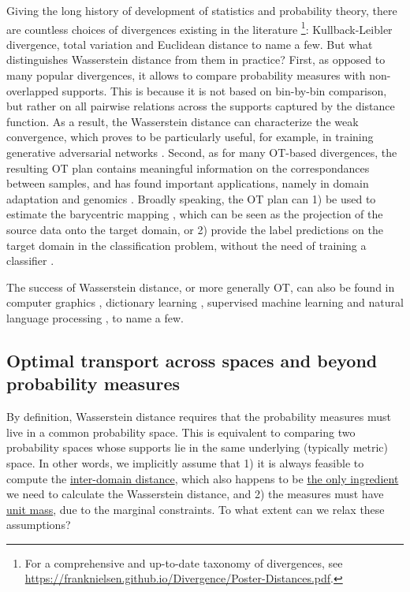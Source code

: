 Giving the long history of development of statistics and probability theory,
there are countless choices of divergences existing in the literature
\footnote{For a comprehensive and up-to-date taxonomy of divergences, see
\url{https://franknielsen.github.io/Divergence/Poster-Distances.pdf}.}:
Kullback-Leibler divergence, total variation and Euclidean distance to name a few.
But what distinguishes Wasserstein distance from them in practice?
First, as opposed to many popular divergences, it allows to compare probability measures with
non-overlapped supports. This is because it is not based on bin-by-bin comparison,
but rather on all pairwise relations across the supports captured by the distance function.
As a result, the Wasserstein distance can characterize the weak convergence,
which proves to be particularly useful, for example, in training generative adversarial networks \citep{Arjovsky17}.
Second, as for many OT-based divergences, the resulting OT plan contains
meaningful information on the correspondances between samples, and has found important applications,
namely in domain adaptation \citep{Courty16} and genomics \citep{Schiebinger19}.
Broadly speaking, the OT plan can 1) be used to estimate the barycentric mapping
\citep{Ferradans14,Courty16}, which can be seen as the projection of the source data
onto the target domain, or 2) provide the label predictions on the target domain
in the classification problem, without the need of training a classifier \citep{Redko19a}.

The success of Wasserstein distance, or more generally OT, can also be found in
computer graphics \citep{Bonneel16,Solomon15,Bonneel23}, dictionary learning \citep{Rolet16},
supervised machine learning \citep{Frogner15} and
natural language processing \citep{Kusner15}, to name a few.

\subsection{Optimal transport across spaces and beyond probability measures}

By definition, Wasserstein distance requires that the probability measures
must live in a common probability space. This is equivalent to comparing two
probability spaces whose supports lie in the same underlying (typically metric) space.
In other words, we implicitly assume that 1) it is always feasible to compute
the \underline{inter-domain distance}, which also happens to be \underline{the only ingredient}
we need to calculate the Wasserstein distance, and 2) the measures must have \underline{unit mass},
due to the marginal constraints. To what extent can we relax these assumptions?

